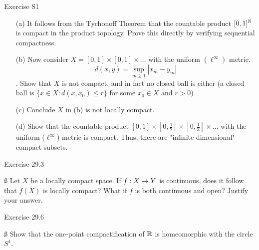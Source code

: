 \documentclass{hmwk}
\begin{document}
\begin{problem}{Exercise S1}
    \begin{itemize}
        \item[(a)] It follows from the Tychonoff Theorem that the countable product $[0, 1]^{\mathbb{N}}$ is compact in the product topology. Prove this directly by verifying sequential compactness. 
        \item[(b)] Now consider $X = [0, 1] \times [0, 1] \times \dots $ with the uniform $(\ell^\infty)$ metric. $$d(x, y) = \sup_{m \geq 1}|x_m - y_m|$$. Show that $X$ is not compact, and in fact no closed ball is either (a closed ball is $\{x \in X : d(x, x_0) \leq r\}$ for some $x_0 \in X$ and $r > 0$)
        \item[(c)] Conclude $X$ in (b) is not locally compact. 
        \item[(d)] Show that the countable product $[0, 1] \times [0, \frac{1}{2}] \times [0, \frac{1}{3}] \times \dots $ with the uniform ($\ell^\infty$) metric is compact. Thus, there are "infinite dimensional" compact subsets. 
    \end{itemize}
\end{problem}

\begin{solution}
    
\end{solution}

\begin{problem}{Exercise 29.3}

    \ss
    \noindent Let $X$ be a locally compact space. If $f: X \rightarrow Y$ is continuous, does it follow that $f(X)$ is locally compact? What if $f$ is both continuous and open? Justify your answer. 
\end{problem}

\begin{solution}
    
\end{solution}

\begin{problem}{Exercise 29.6}

    \ss
    \noindent
    Show that the one-point compactification of $\mathbb{R}$ is homeomorphic with the circle $S^1$.
\end{problem}
\end{document}
